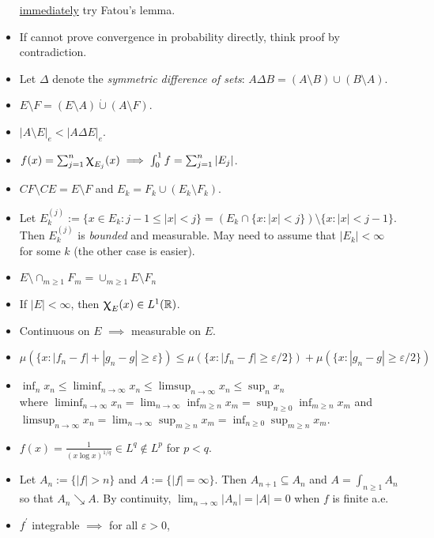 \documentclass[12pt,reqno]{article}
\renewcommand{\emph}[1]{\textit{#1}}
\theoremstyle{plain}
\theoremstyle{definition}
\renewcommand{\chi}{\scalebox{1.25}{$\upchi$}}
\begin{document}
\begin{itemize}
     \underline{immediately} try Fatou's lemma. 
\item If cannot prove convergence in probability directly, think proof by contradiction. 
\item Let $\Delta$ denote the \emph{symmetric difference of sets}: 
     $A \Delta B = (A \setminus B) \cup (B \setminus A)$. 
\item $E \setminus F = (E \setminus A) \dot{\cup} (A \setminus F)$. 
\item $|A \setminus E|_e < |A \Delta E|_e$. 
\item $f(x) = \sum_{j=1}^n \chi_{E_j}(x) \implies \int_0^1 f = \sum_{j=1}^n |E_j|$. 
\item $CF \setminus CE = E \setminus F$ and $E_k = F_k \cup (E_k \setminus F_k)$. 
\item Let $E_k^{(j)} := \{x \in E_k : j-1 \leq |x| < j\} = 
     (E_k \cap \{x : |x| < j\}) \setminus \{x : |x| < j-1\}$. Then $E_k^{(j)}$ is 
     \emph{bounded} and measurable. May need to assume that $|E_k| < \infty$ for some $k$ 
     (the other case is easier). 
\item $E \setminus \cap_{m \geq 1} F_m = \cup_{m \geq 1} E \setminus F_n$ 
\item If $|E| < \infty$, then $\chi_E(x) \in L^1(\mathbb{R})$. 
\item Continuous on $E$ $\implies$ measurable on $E$. 
\item $\mu(\{x : |f_n-f|+|g_n-g| \geq \varepsilon\}) \leq 
     \mu(\{x : |f_n-f| \geq \varepsilon / 2\}) + \mu(\{x : |g_n-g| \geq \varepsilon / 2\})$ 
\item $\inf_n x_n \leq \liminf_{n \rightarrow \infty} x_n \leq 
     \limsup_{n \rightarrow \infty} x_n 
     \leq \sup_n x_n$ \\ where 
     $\liminf_{n \rightarrow \infty} x_n = \lim_{n \rightarrow \infty} \inf_{m \geq n} x_m = 
     \sup_{n \geq 0} \inf_{m \geq n} x_m$ and \\ 
     $\limsup_{n \rightarrow \infty} x_n = \lim_{n \rightarrow \infty} \sup_{m \geq n} x_m = 
     \inf_{n \geq 0} \sup_{m \geq n} x_m$. 
\item $f(x) = \frac{1}{(x \log x)^{1/q}} \in L^q \notin L^p$ for $p < q$. 
\item Let $A_n := \{|f| > n\}$ and $A := \{|f| = \infty\}$. Then $A_{n+1} \subseteq A_n$ and 
     $A = \int_{n \geq 1} A_n$ so that $A_n \searrow A$. By continuity, 
     $\lim_{n \rightarrow \infty} |A_n| = |A| = 0$ when $f$ is finite a.e. 
\item $f^{\prime}$ integrable $\implies$ for all $\varepsilon > 0$, 

\end{itemize}
\end{document}
